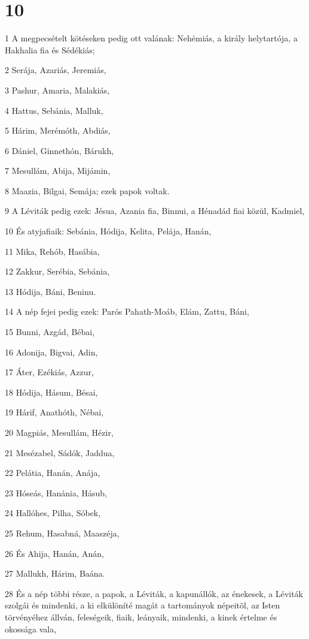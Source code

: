 \chapter{10}

\par 1 A megpecsételt kötéseken pedig ott valának: Nehémiás, a király helytartója, a Hakhalia fia és Sédékiás;
\par 2 Serája, Azariás, Jeremiás,
\par 3 Pashur, Amaria, Malakiás,
\par 4 Hattus, Sebánia, Malluk,
\par 5 Hárim, Merémóth, Abdiás,
\par 6 Dániel, Ginnethón, Bárukh,
\par 7 Mesullám, Abija, Mijámin,
\par 8 Maazia, Bilgai, Semája; ezek papok voltak.
\par 9 A Léviták pedig ezek: Jésua, Azania fia, Binnui, a Hénadád fiai közül, Kadmiel,
\par 10 És atyjafiaik: Sebánia, Hódija, Kelita, Pelája, Hanán,
\par 11 Mika, Rehób, Hasábia,
\par 12 Zakkur, Serébia, Sebánia,
\par 13 Hódija, Báni, Beninu.
\par 14 A nép fejei pedig ezek: Parós Pahath-Moáb, Elám, Zattu, Báni,
\par 15 Bunni, Azgád, Bébai,
\par 16 Adonija, Bigvai, Adin,
\par 17 Áter, Ezékiás, Azzur,
\par 18 Hódija, Hásum, Bésai,
\par 19 Hárif, Anathóth, Nébai,
\par 20 Magpiás, Mesullám, Hézir,
\par 21 Mesézabel, Sádók, Jaddua,
\par 22 Pelátia, Hanán, Anája,
\par 23 Hóseás, Hanánia, Hásub,
\par 24 Hallóhes, Pilha, Sóbek,
\par 25 Rehum, Hasabná, Maaszéja,
\par 26 És Ahija, Hanán, Anán,
\par 27 Mallukh, Hárim, Baána.
\par 28 És a nép többi része, a papok, a Léviták, a kapunállók, az énekesek, a Léviták szolgái és mindenki, a ki elkülöníté magát a tartományok népeitõl, az Isten törvényéhez állván, feleségeik, fiaik, leányaik, mindenki, a kinek értelme és okossága vala,

